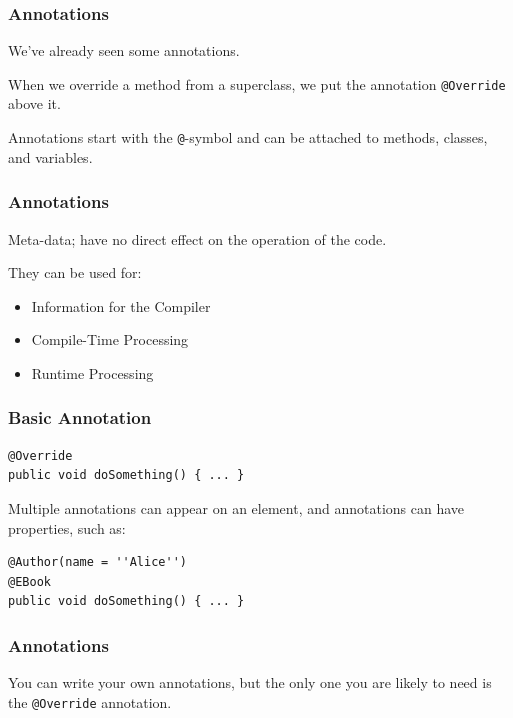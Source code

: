 \begin{frame}
\frametitle{Annotations}
\begin{changemargin}{1cm}

We've already seen some annotations. 

When we override a method from a superclass, we put the annotation \texttt{@Override} above it. 

Annotations start with the \texttt{@}-symbol and can be attached to methods, classes, and variables. 

\end{changemargin}
\end{frame}

\begin{frame}
\frametitle{Annotations}
\begin{changemargin}{1cm}

Meta-data; have no direct effect on the operation of the code.

They can be used for:

\begin{itemize}
	\item Information for the Compiler
	\item Compile-Time Processing
	\item Runtime Processing
\end{itemize}


\end{changemargin}
\end{frame}


\begin{frame}[fragile]
\frametitle{Basic Annotation}
\begin{changemargin}{1cm}

\begin{verbatim}
@Override
public void doSomething() { ... }
\end{verbatim}

Multiple annotations can appear on an element, and annotations can have properties, such as:

\begin{verbatim}
@Author(name = ''Alice'')
@EBook
public void doSomething() { ... }
\end{verbatim}

\end{changemargin}
\end{frame}

\begin{frame}
\frametitle{Annotations}
\begin{changemargin}{1cm}

You can write your own annotations, but the only one you are likely to need is the \texttt{@Override} annotation. 

\end{changemargin}
\end{frame}


